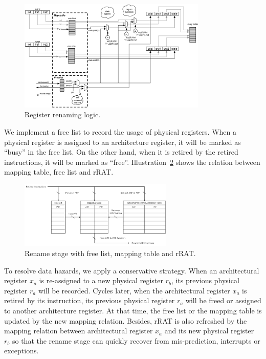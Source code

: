 \begin{figure}[!htp]
    \centering
    \includegraphics[width=0.8\textwidth]{figure/rename-pipeline.png}
    \caption{Register renaming logic.}
    \label{fig:rename}
\end{figure}

We implement a free list to record the usage of physical registers. When a physical register is assigned to an architecture register, it will be marked as ``busy'' in the free list. On the other hand, when it is retired by the retired instructions, it will be marked as ``free''. Illustration~\ref{fig:mapping} shows the relation between mapping table, free list and rRAT.

\begin{figure}[!htp]
    \centering
    \includegraphics[width=0.65\textwidth]{figure/map_rename.png}
    \caption{Rename stage with free list, mapping table and rRAT.}
    \label{fig:mapping}
\end{figure}

To resolve data hazards, we apply a conservative strategy. When an architectural register $x_a$ is re-assigned to a new physical register $r_b$, its previous physical register $r_a$ will be recorded. Cycles later, when the architectural register $x_a$ is retired by its instruction, its previous physical register $r_a$ will be freed or assigned to another architecture register. At that time, the free list or the mapping table is updated by the new mapping relation. Besides, rRAT is also refreshed by the mapping relation between architectural register $x_a$ and its new physical register $r_b$ so that the rename stage can quickly recover from mis-prediction, interrupts or exceptions.


